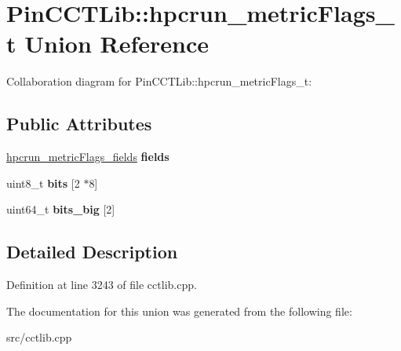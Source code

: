 \hypertarget{unionPinCCTLib_1_1hpcrun__metricFlags__t}{\section{Pin\-C\-C\-T\-Lib\-:\-:hpcrun\-\_\-metric\-Flags\-\_\-t Union Reference}
\label{unionPinCCTLib_1_1hpcrun__metricFlags__t}
}


Collaboration diagram for Pin\-C\-C\-T\-Lib\-:\-:hpcrun\-\_\-metric\-Flags\-\_\-t\-:
\subsection*{Public Attributes}
\begin{DoxyCompactItemize}
\item 
\hypertarget{unionPinCCTLib_1_1hpcrun__metricFlags__t_ab33d425d34ce3c31483c202af79cf014}{\hyperlink{structPinCCTLib_1_1hpcrun__metricFlags__fields}{hpcrun\-\_\-metric\-Flags\-\_\-fields} {\bfseries fields}}\label{unionPinCCTLib_1_1hpcrun__metricFlags__t_ab33d425d34ce3c31483c202af79cf014}

\item 
\hypertarget{unionPinCCTLib_1_1hpcrun__metricFlags__t_a0d35f568478b431e129640fe8a7d659e}{uint8\-\_\-t {\bfseries bits} \mbox{[}2 $\ast$8\mbox{]}}\label{unionPinCCTLib_1_1hpcrun__metricFlags__t_a0d35f568478b431e129640fe8a7d659e}

\item 
\hypertarget{unionPinCCTLib_1_1hpcrun__metricFlags__t_aaeb1e02dd139e533447a4892be35a3bc}{uint64\-\_\-t {\bfseries bits\-\_\-big} \mbox{[}2\mbox{]}}\label{unionPinCCTLib_1_1hpcrun__metricFlags__t_aaeb1e02dd139e533447a4892be35a3bc}

\end{DoxyCompactItemize}


\subsection{Detailed Description}


Definition at line 3243 of file cctlib.\-cpp.



The documentation for this union was generated from the following file\-:\begin{DoxyCompactItemize}
\item 
src/cctlib.\-cpp\end{DoxyCompactItemize}
